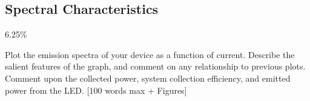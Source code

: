 \subsection{Spectral Characteristics}
\label{sec:test:spectral}

6.25\%

Plot the emission spectra of your device as a function of current. Describe the salient features of the graph, and comment on any relationship to previous plots. Comment upon the collected power, system collection efficiency, and emitted power from the LED. [100 words max + Figures]
